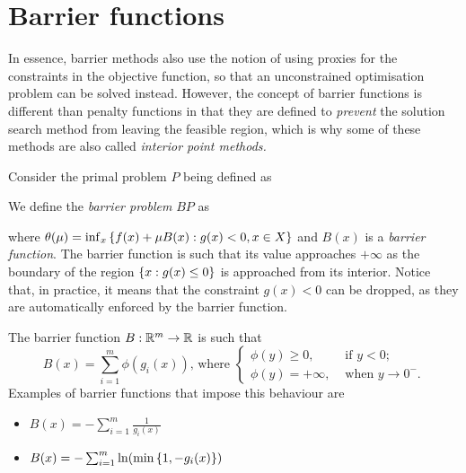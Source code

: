 \section{Barrier functions}

In essence, barrier methods also use the notion of using proxies for the constraints in the objective function, so that an unconstrained optimisation problem can be solved instead. However, the concept of barrier functions is different than penalty functions in that they are defined to \emph{prevent} the solution search method from leaving the feasible region, which is why some of these methods are also called \emph{interior point methods.} 

Consider the primal problem $P$ being defined as

We define the \emph{barrier problem} $BP$ as 
\vspace{-3pt}
	\begin{flalign*}
	(BP) :~ \inf_{\mu} \ & \theta(\mu) \\ 
	\st & \mu > 0 
\end{flalign*}

where $\theta(\mu) = \inf_x\left\{ f(x) + \mu B(x) : g(x) < 0, x \in X \right \}$ and $B(x)$ is a \emph{barrier function}. The barrier function is such that its value approaches $+\infty$ as the boundary of the region $\left\{ x : g(x) \leq 0 \right \}$ is approached from its interior. Notice that, in practice, it means that the constraint $g(x) < 0$ can be dropped, as they are automatically enforced by the barrier function.  

The barrier function $B: \mathbb{R}^m \rightarrow \mathbb{R}$ is such that
%
\begin{equation}
B(x) = \sum_{i=1}^m \phi(g_i(x)) \text{, where }
\begin{cases}  
	\phi(y) \geq 0, &\text{ if } y < 0; \\ 
    \phi(y) = +\infty, &\text{ when } y \rightarrow 0^{-}.
\end{cases} \label{eq:barrier_prop}                 
\end{equation}
%
Examples of barrier functions that impose this behaviour are 
\begin{itemize}
\item $B(x) = -\sum_{i=1}^m \frac{1}{g_i(x)}$
\item $B(x) = -\sum_{i=1}^m \ln(\min\left\{ 1, -g_i(x) \right \})$
\end{itemize}

